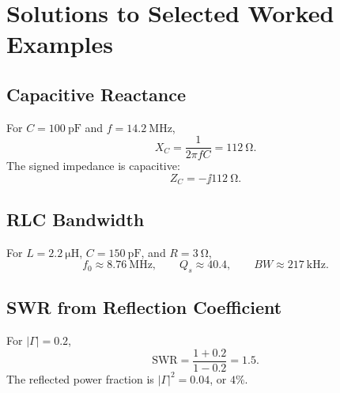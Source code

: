 \chapter{Solutions to Selected Worked Examples}
\section{Capacitive Reactance}
For \(C=\SI{100}{\pico\farad}\) and \(f=\SI{14.2}{\mega\hertz}\),
\[
X_C=\frac{1}{2\pi f C}=\SI{112}{\ohm}.
\]
The signed impedance is capacitive:
\[
Z_C=-\jj\SI{112}{\ohm}.
\]

\section{RLC Bandwidth}
For \(L=\SI{2.2}{\micro\henry}\), \(C=\SI{150}{\pico\farad}\), and
\(R=\SI{3}{\ohm}\),
\[
f_0\approx \SI{8.76}{\mega\hertz},
\qquad
Q_s\approx 40.4,
\qquad
BW\approx \SI{217}{\kilo\hertz}.
\]

\section{SWR from Reflection Coefficient}
For \(|\Gamma|=0.2\),
\[
\mathrm{SWR}=\frac{1+0.2}{1-0.2}=1.5.
\]
The reflected power fraction is \(|\Gamma|^2=0.04\), or \(4\%\).
